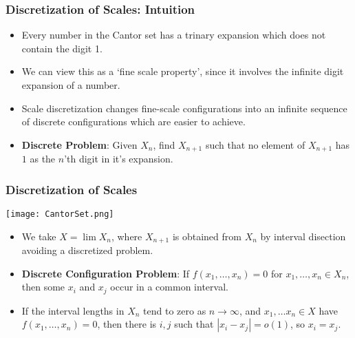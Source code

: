 \documentclass{beamer}
\begin{document}
\begin{frame}
    \frametitle{Discretization of Scales: Intuition}

    \begin{itemize}
        \item Every number in the Cantor set has a trinary expansion which does not contain the digit 1.
        \pause

        \item We can view this as a `fine scale property', since it involves the infinite digit expansion of a number.
        \pause

        \item Scale discretization changes fine-scale configurations into an infinite sequence of discrete configurations which are easier to achieve.
        \pause

        \item {\bf Discrete Problem}: Given $X_n$, find $X_{n+1}$ such that no element of $X_{n+1}$ has $1$ as the $n$'th digit in it's expansion.
    \end{itemize}
\end{frame}

\begin{frame}
    \frametitle{Discretization of Scales}

    \begin{center}
    \texttt{[image: CantorSet.png]}
    \end{center}

    \begin{itemize}

        \item We take $X = \lim X_n$, where $X_{n+1}$ is obtained from $X_n$ by interval disection avoiding a discretized problem.
        \pause

        \item {\bf Discrete Configuration Problem}: If $f(x_1, \dots, x_n) = 0$ for $x_1, \dots, x_n \in X_n$, then some $x_i$ and $x_j$ occur in a common interval.
        \pause

        \item If the interval lengths in $X_n$ tend to zero as $n \to \infty$, and $x_1, \dots x_n \in X$ have $f(x_1, \dots, x_n) = 0$, then there is $i,j$ such that $|x_i - x_j| = o(1)$, so $x_i = x_j$.
    \end{itemize}
\end{frame}
\end{document}
